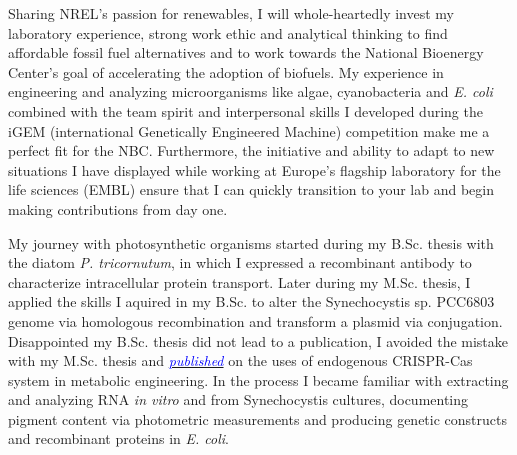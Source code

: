 \documentclass[11pt,a4paper,sans]{moderncv}
\date{\today}
\begin{document}
     
\makelettertitle
\begin{spacing}{1.2}


Sharing NREL's passion for renewables, I will whole-heartedly invest my laboratory experience, strong work ethic and analytical thinking to find affordable fossil fuel alternatives and to work towards the National Bioenergy Center's goal of accelerating the adoption of biofuels.
My experience in engineering and analyzing microorganisms like algae, cyanobacteria and \textit{E. coli} combined with the team spirit and interpersonal skills I developed during the iGEM (international Genetically Engineered Machine) competition make me a perfect fit for the NBC. 
Furthermore, the initiative and ability to adapt to new situations I have displayed while working at Europe's flagship laboratory for the life sciences (EMBL) ensure that I can quickly transition to your lab and begin making contributions from day one.\par\vspace*{3mm}


My journey with photosynthetic organisms started during my B.Sc. thesis with the diatom \textit{P. tricornutum}, in which I expressed a recombinant antibody to characterize intracellular protein transport. 
Later during my M.Sc. thesis, I applied the skills I aquired in my B.Sc. to alter the Synechocystis sp. PCC6803 genome via homologous recombination and transform a plasmid via conjugation. 
Disappointed my B.Sc. thesis did not lead to a publication, I avoided the mistake with my M.Sc. thesis and {\href{https://www.tandfonline.com/eprint/vmAQ3vjYGdZIZpIKQTIT/full}{\textcolor{blue}{{\textit{published}}}}} on the uses of endogenous CRISPR-Cas system in metabolic engineering.
In the process I became familiar with extracting and analyzing RNA \textit{in vitro} and from Synechocystis cultures, documenting pigment content via photometric measurements and producing genetic constructs and recombinant proteins in \textit{E. coli}.\par\vspace*{3mm}
 

\end{spacing}
\end{document}
